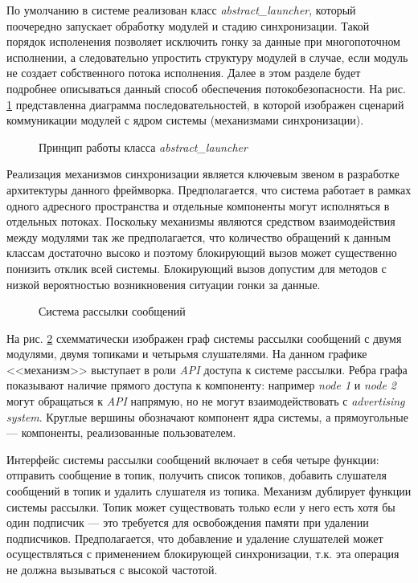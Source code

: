 По умолчанию в системе реализован класс \textit{abstract\_launcher}, который поочередно запускает обработку модулей и стадию синхронизации. Такой порядок исполенения позволяет исключить гонку за данные при многопоточном исполнении, а следовательно упростить структуру модулей в случае, если модуль не создает собственного потока исполнения. Далее в этом разделе будет подробнее описываться данный способ обеспечения потокобезопасности. На рис. \ref{im:2_2_2_sequence_diag} представленна диаграмма последовательностей, в которой изображен сценарий коммуникации модулей с ядром системы (механизмами синхронизации).

\begin{figure}[h]
    \caption{Принцип работы класса \textit{abstract\_launcher}}
    \label{im:2_2_2_sequence_diag}
\end{figure}

Реализация механизмов синхронизации является ключевым звеном в разработке архитектуры данного фреймворка. Предполагается, что система работает в рамках одного адресного пространства и отдельные компоненты могут исполняться в отдельных потоках. Поскольку механизмы являются средством взаимодействия между модулями так же предполагается, что количество обращений к данным классам достаточно высоко и поэтому блокирующий вызов может существенно понизить отклик всей системы. Блокирующий вызов допустим для методов с низкой вероятностью возникновения ситуации гонки за данные.

\begin{figure}[h]
    \caption{Система рассылки сообщений}
    \label{im:2_2_3_topic}
\end{figure}

На рис. \ref{im:2_2_3_topic} схемматически изображен граф системы рассылки сообщений с двумя модулями, двумя топиками и четырьмя слушателями. На данном графике <<механизм>> выступает в роли \textit{API} доступа к системе рассылки. Ребра графа показывают наличие прямого доступа к компоненту: например \textit{node 1} и \textit{node 2} могут обращаться к \textit{API} напрямую, но не могут взаимодействовать с \textit{advertising system}. Круглые вершины обозначают компонент ядра системы, а прямоугольные --- компоненты, реализованные пользователем.

Интерфейс системы рассылки сообщений включает в себя четыре функции: отправить сообщение в топик, получить список топиков, добавить слушателя сообщений в топик и удалить слушателя из топика. Механизм дублирует функции системы рассылки. Топик может существовать только если у него есть хотя бы один подписчик --- это требуется для освобождения памяти при удалении подписчиков. Предполагается, что добавление и удаление слушателей может осуществляться с применением блокирующей синхронизации, т.к. эта операция не должна вызываться с высокой частотой.

